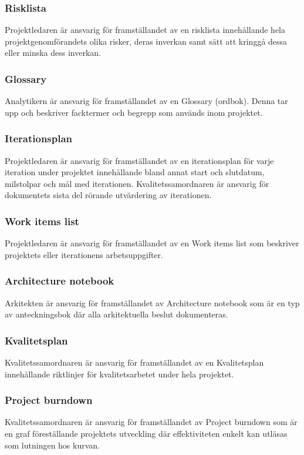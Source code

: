 \subsubsection{Risklista}
Projektledaren är ansvarig för framställandet av en risklista innehållande hela projektgenomförandets olika risker, deras inverkan samt sätt att kringgå dessa eller minska dess inverkan.

\subsubsection{Glossary}
Analytikern är ansvarig för framställandet av en Glossary (ordbok). Denna tar upp och beskriver facktermer och begrepp som används inom projektet.

\subsubsection{Iterationsplan}
Projektledaren är ansvarig för framställandet av en iterationsplan för varje iteration under projektet innehållande bland annat start och slutdatum, milstolpar och mål med iterationen. Kvalitetssamordnaren är ansvarig för dokumentets sista del rörande utvärdering av iterationen.

\subsubsection{Work items list}
Projektledaren är ansvarig för framställandet av en Work items list som beskriver projektets eller iterationens arbetsuppgifter.

\subsubsection{Architecture notebook}
Arkitekten är ansvarig för framställandet av Architecture notebook som är en typ av anteckningsbok där alla arkitektuella beslut dokumenteras.

\subsubsection{Kvalitetsplan}
Kvalitetssamordnaren är ansvarig för framställandet av en Kvalitetsplan innehållande riktlinjer för kvalitetsarbetet under hela projektet.

\subsubsection{Project burndown}
Kvalitetssamordnaren är ansvarig för framställandet av Project burndown som är en graf föreställande projektets utveckling där effektiviteten enkelt kan utläsas som lutningen hos kurvan.

